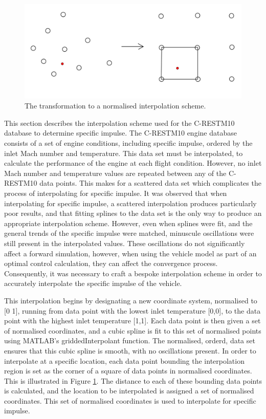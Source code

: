 \begin{figure}[ht]
	\centering
	\includegraphics[width=0.8\linewidth]{figures/A1_uncertainty-analysis/interp}
	\caption{The transformation to a normalised interpolation scheme.}
	\label{fig:interp}
\end{figure}
This section describes the interpolation scheme used for the C-RESTM10 database to determine specific impulse.
The C-RESTM10 engine database consists of a set of engine conditions, including specific impulse, ordered by the inlet Mach number and temperature. This data set must be interpolated, to calculate the performance of the engine at each flight condition. However, no inlet Mach number and temperature values are repeated between any of the C-RESTM10 data points. This makes for a scattered data set which complicates the process of interpolating for specific impulse. It was observed that when interpolating for specific impulse, a scattered interpolation produces particularly poor results, and that fitting splines to the data set is the only way to produce an appropriate interpolation scheme. However, even when splines were fit, and the general trends of the specific impulse were matched, minuscule oscillations were still present in the interpolated values. These oscillations do not significantly affect a forward simulation, however, when using the vehicle model as part of an optimal control calculation, they can affect the convergence process. Consequently, it was necessary to craft a bespoke interpolation scheme in order to accurately interpolate the specific impulse of the vehicle. 

This interpolation begins by designating a new coordinate system, normalised to [0 1], running from data point with the lowest inlet temperature [0,0], to the data point with the highest inlet temperature [1,1]. Each data point is then given a set of normalised coordinates, and a cubic spline is fit to this set of normalised points using MATLAB's \textsf{griddedInterpolant} function. The normalised, orderd, data set ensures that this cubic spline is smooth, with no oscillations present. In order to interpolate at a specific location, each data point bounding the interpolation region is set as the corner of a square of data points in normalised coordinates. This is illustrated in Figure \ref{fig:interp}. The distance to each of these bounding data points is calculated, and the location to be interpolated is assigned a set of normalised coordinates. This set of normalised coordinates is used to interpolate for specific impulse. 

